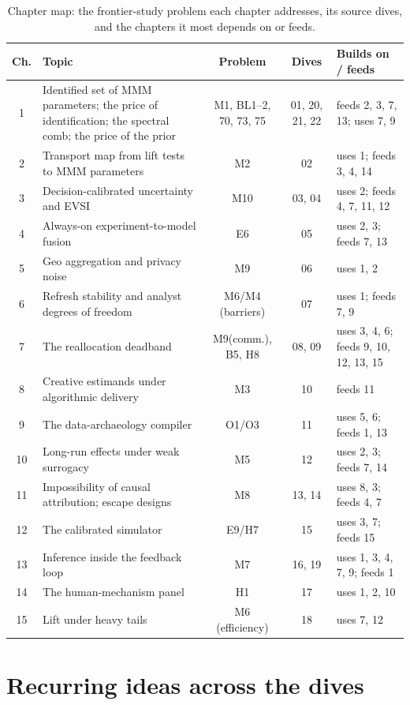 \begin{table}[htbp]
\centering\small
\caption{Chapter map: the frontier-study problem each chapter addresses, its source dives, and the chapters it most depends on or feeds.}
\label{tab:map}
\begin{tabular}{@{}c p{2.55in} c c p{1.55in}@{}}
\toprule
Ch. & Topic & Problem & Dives & Builds on / feeds \\
\midrule
1 & Identified set of MMM parameters; the price of identification; the spectral comb; the price of the prior & M1, BL1--2, 70, 73, 75 & 01, 20, 21, 22 & feeds 2, 3, 7, 13; uses 7, 9 \\
2 & Transport map from lift tests to MMM parameters & M2 & 02 & uses 1; feeds 3, 4, 14 \\
3 & Decision-calibrated uncertainty and EVSI & M10 & 03, 04 & uses 2; feeds 4, 7, 11, 12 \\
4 & Always-on experiment-to-model fusion & E6 & 05 & uses 2, 3; feeds 7, 13 \\
5 & Geo aggregation and privacy noise & M9 & 06 & uses 1, 2 \\
6 & Refresh stability and analyst degrees of freedom & M6/M4 (barriers) & 07 & uses 1; feeds 7, 9 \\
7 & The reallocation deadband & M9(comm.), B5, H8 & 08, 09 & uses 3, 4, 6; feeds 9, 10, 12, 13, 15 \\
8 & Creative estimands under algorithmic delivery & M3 & 10 & feeds 11 \\
9 & The data-archaeology compiler & O1/O3 & 11 & uses 5, 6; feeds 1, 13 \\
10 & Long-run effects under weak surrogacy & M5 & 12 & uses 2, 3; feeds 7, 14 \\
11 & Impossibility of causal attribution; escape designs & M8 & 13, 14 & uses 8, 3; feeds 4, 7 \\
12 & The calibrated simulator & E9/H7 & 15 & uses 3, 7; feeds 15 \\
13 & Inference inside the feedback loop & M7 & 16, 19 & uses 1, 3, 4, 7, 9; feeds 1 \\
14 & The human-mechanism panel & H1 & 17 & uses 1, 2, 10 \\
15 & Lift under heavy tails & M6 (efficiency) & 18 & uses 7, 12 \\
\bottomrule
\end{tabular}
\end{table}

\section*{Recurring ideas across the dives}

